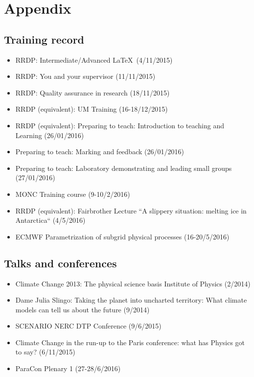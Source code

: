 \documentclass[11pt,a4paper]{article}
\begin{document}
\printbibliography[title={References}]

\newpage
\section*{Appendix}

\subsection*{Training record}

\begin{itemize}
  \item RRDP: Intermediate/Advanced \LaTeX\ (4/11/2015)
  \item RRDP: You and your supervisor (11/11/2015)
  \item RRDP: Quality assurance in research (18/11/2015)
  \item RRDP (equivalent): UM Training (16-18/12/2015)
  \item RRDP (equivalent): Preparing to teach: Introduction to teaching and Learning (26/01/2016)
  \item Preparing to teach: Marking and feedback (26/01/2016)
  \item Preparing to teach: Laboratory demonstrating and leading small groups (27/01/2016)
  \item MONC Training course (9-10/2/2016)
  \item RRDP (equivalent): Fairbrother Lecture ``A slippery situation: melting ice in Antarctica`` (4/5/2016)
  \item ECMWF Parametrization of subgrid physical processes (16-20/5/2016)
\end{itemize}

\subsection*{Talks and conferences}

\begin{itemize}
  \item Climate Change 2013: The physical science basis Institute of Physics (2/2014)
  \item Dame Julia Slingo: Taking the planet into uncharted territory: What climate models can tell us about the future (9/2014)
  \item SCENARIO NERC DTP Conference (9/6/2015)
  \item Climate Change in the run-up to the Paris conference: what has Physics got to say? (6/11/2015)
  \item ParaCon Plenary 1 (27-28/6/2016)
\end{itemize}
\end{document}
